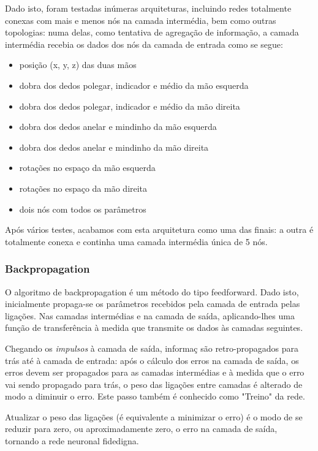 \documentclass[10pt,a4paper]{article}
\begin{document}
Dado isto, foram testadas inúmeras arquiteturas, incluindo redes totalmente conexas com mais e menos nós na camada intermédia, bem como outras topologias: numa delas, como tentativa de agregação de informação, a camada intermédia recebia os dados dos nós da camada de entrada como se segue:
\begin{itemize}
\item posição (x, y, z) das duas mãos
\item dobra dos dedos polegar, indicador e médio da mão esquerda
\item dobra dos dedos polegar, indicador e médio da mão direita
\item dobra dos dedos anelar e mindinho da mão esquerda
\item dobra dos dedos anelar e mindinho da mão direita
\item rotações no espaço da mão esquerda
\item rotações no espaço da mão direita
\item dois nós com todos os parâmetros
\end{itemize}
Após vários testes, acabamos com esta arquitetura como uma das finais: a outra é totalmente conexa e continha uma camada intermédia única de 5 nós.


\subsubsection{Backpropagation}

O algoritmo de backpropagation é um método do tipo feedforward.
Dado isto, inicialmente propaga-se os parâmetros recebidos pela camada de entrada pelas ligações. Nas camadas intermédias e na camada de saída, aplicando-lhes uma função de transferência à medida que transmite os dados às camadas seguintes. 

Chegando os \textit{impulsos} à camada de saída, informaç são retro-propagados para trás até à camada de entrada: após o cálculo dos erros na camada de saída, os erros devem ser propagados para as camadas intermédias e à medida que o erro vai sendo propagado para trás, o peso das ligações entre camadas é alterado de modo a diminuir o erro. Este passo também é conhecido como "Treino" da rede.

Atualizar o peso das ligações (é equivalente a minimizar o erro) é o modo de se reduzir para zero, ou aproximadamente zero, o erro na camada de saída, tornando a rede neuronal fidedigna.
\end{document}
